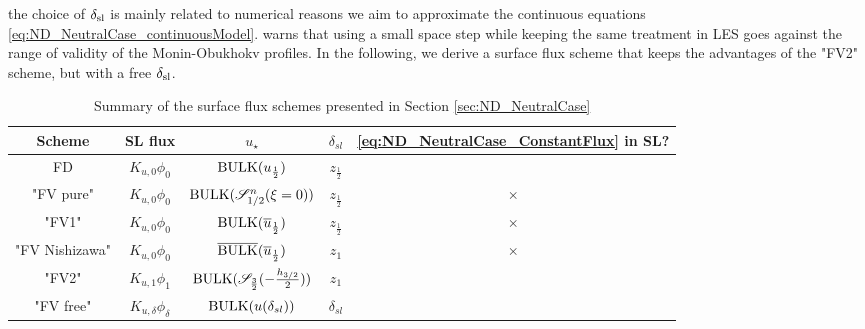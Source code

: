 the choice of $\delta_{\rm sl}$ is mainly related to numerical
reasons we aim to approximate the continuous equations
\eqref{eq:ND_NeutralCase_continuousModel}.
\cite{basu_cautionary_2017} warns that using a small space step
while keeping the same treatment in LES goes against the
range of validity of the Monin-Obukhokv profiles.
In the following, we derive a surface flux scheme that keeps
the advantages of the "FV2" scheme, but with a free $\delta_{\rm sl}$.
%
\begin{table}
	\centering
\begin{tabular}{c|c|c|c|c}
	Scheme & SL flux & $u_\star$ & $\delta_{sl}$ 
		& \eqref{eq:ND_NeutralCase_ConstantFlux} in SL? \\
		\hline
		FD & $K_{u,0} \phi_0$ & ${\rm BULK}(u_{\frac{1}{2}})$
			& $z_{\frac{1}{2}}$ & \checkmark \\
		"FV pure" & $K_{u,0} \phi_0$ &
			${\rm BULK}({\cal S}_{1/2}^{n}(\xi=0))$
			& $z_{\frac{1}{2}}$ & $\times$ \\
		"FV1" & $K_{u,0} \phi_0$ &
			${\rm BULK}(\overline{u}_{\frac{1}{2}})$
			& $z_{\frac{1}{2}}$ & $\times$ \\
		"FV Nishizawa" & $K_{u,0} \phi_0$ &
			$\overline{\rm BULK}
				(\overline{u}_{\frac{1}{2}})$
			& $z_1$ & $\times$ \\
		"FV2" & $K_{u,1} \phi_1$ &
			${\rm BULK} ({\cal S}_{\frac{3}{2}}(
				  -\frac{h_{3/2}}{2}))$
			& $z_1$ & \checkmark \\
		"FV free" & $K_{u,\delta} \phi_{\delta}$ &
			${\rm BULK}
				(u(\delta_{sl}))$
			& $\delta_{sl}$ & \checkmark \\
	\end{tabular}
	\caption{Summary of the surface flux schemes presented in
	Section \ref{sec:ND_NeutralCase}}
	\label{tab:ND_NeutralCase_summary_sfscheme}
\end{table}
